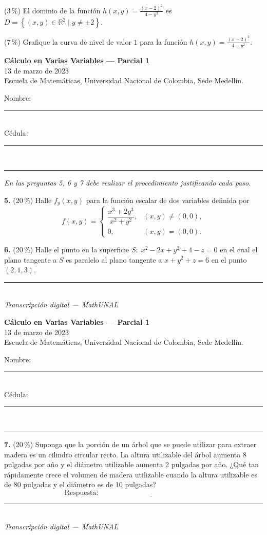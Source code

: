 \documentclass[11pt]{article}
\newcommand{\examheader}{%
  \noindent
  \begin{minipage}[t]{0.62\linewidth}
    {\bfseries\large C\'alculo en Varias Variables --- Parcial 1}\\
    {\small 13 de marzo de 2023}\\
    {\small Escuela de Matem\'aticas, Universidad Nacional de Colombia, Sede Medell\'in.}
  \end{minipage}%
  \hfill
  \begin{minipage}[t]{0.33\linewidth}
    \raggedleft\small
    Nombre: \rule{2.8cm}{0.4pt}\\[4pt]
    C\'edula: \rule{2.8cm}{0.4pt}
  \end{minipage}\\[4pt]
  \rule{\linewidth}{0.6pt}
}
\newcommand{\examfooter}{%
  \vfill
  \rule{\linewidth}{0.4pt}\\[1pt]
  {\scriptsize\textit{Transcripci\'on digital --- MathUNAL}\hfill\textcolor{unalblue}{\textbf{\thepage}}}
}
\begin{document}
\begin{opciones}
  \item[$\bullet$] (3\,\%) El dominio de la funci\'on $\displaystyle h(x,y)=\frac{(x-2)^2}{4-y^2}$ es $D = \left\{(x,y)\in\mathbb{R}^2 \mid y\neq\pm 2\right\}$.
  \item[$\bullet$] (7\,\%) Grafique la curva de nivel de valor $1$ para la funci\'on $\displaystyle h(x,y)=\frac{(x-2)^2}{4-y^2}$.
\end{opciones}

\begin{center}
\end{center}

\newpage
\examheader
\vspace{2pt}

\textit{En las preguntas 5, 6 y 7 debe realizar el procedimiento justificando cada paso.}

\bigskip
\noindent\textbf{5.} (20\,\%) Halle $f_y(x,y)$ para la funci\'on escalar de dos variables definida por
$$
f(x,y)=
\begin{cases}
\dfrac{x^3+2y^3}{x^2+y^2}, & (x,y)\neq (0,0),\\[6pt]
0, & (x,y)=(0,0).
\end{cases}
$$

\bigskip
\bigskip
\noindent\textbf{6.} (20\,\%) Halle el punto en la superficie $S:\; x^2-2x+y^2+4-z=0$ en el cual el plano tangente a $S$ es paralelo al plano tangente a $x+y^2+z=6$ en el punto $(2,1,3)$.

\vfill
\examfooter
\newpage
\examheader
\vspace{2pt}

\noindent\textbf{7.} (20\,\%) Suponga que la porci\'on de un \'arbol que se puede utilizar para extraer madera es un cilindro circular recto. La altura utilizable del \'arbol aumenta 8 pulgadas por a\~no y el di\'ametro utilizable aumenta 2 pulgadas por a\~no. ¿Qu\'e tan r\'apidamente crece el volumen de madera utilizable cuando la altura utilizable es de 80 pulgadas y el di\'ametro es de 10 pulgadas?
$$\text{Respuesta:}\ \underline{\hspace{6cm}}$$

\vfill
\examfooter
\end{document}
